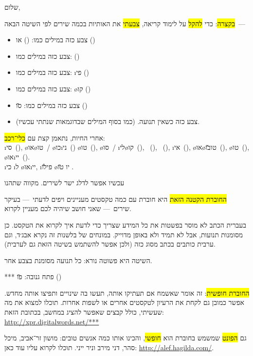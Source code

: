 שלום,

\hl{בקצרה}: כדי \hl{להקל} על לימוד קריאה, \hl{צבעתי} את האותיות בכמה שירים לפי השיטה הבאה~—
\begin{itemize}
	\item צבע כזה  במילים כמו:  () או  ()
	\item צבע כזה  במילים כמו:  ()
	\item צבע כזה  במילים כמו: \i{פי} ()
	\item צבע כזה  במילים כמו: \o{קו} ()
	\item צבע כזה  במילים כמו: \u{סו} ()
	\item צבע כזה  כשאין תנועה. (כמו בסוף המילים שבדוגמאות שנתתי עכשיו).
\end{itemize}

אחרי החיות, נתאמן קצת עם \hl{כלי־רכב}:\\
\i{סי}~(),
\o{או}\o{טו}~/ \o{כו}\i{ני}~()
\o{טו}~(),
\o{סו}~/ \i{לי}\o{קו}~(),
~(),
~(),
\i{אי}~(),
\o{או}\o{טו}\u{בו}~(),
\o{טו}~(),
\o{או}\i{יי}~().\\
\i{כי}  \i{ל}  \o{או}\i{יי},  \i{פי}\u{לו} \o{יו}  \u{טו} .

עכשיו אפשר לדלג ישר לשירים. מקווה שתהנו 

\hl{החוברת הקטנה הזאת} היא חוברת עם כמה טקסטים מעניינים ויפים לדעתי~— בעיקר שירים~— שאני חושב שיהיה לכם מעניין לקרוא.

בעברית הכתב לא מוסר בפשטות את כל המידע שצריך כדי לדעת איך לקרוא את הטקסט. כן מסומנות תנועות, אבל לא תמיד ולא באופן מדוייק. במונחים של בלשנות זה נקרא אבג׳ד, וגם ערבית כותבים בכתב מסוג כזה (ולכן אפשר להשתמש בשיטה הזאת גם לערבית).

השיטה היא פשוטה נורא: כל תנועה מסומנת בצבע אחר.

*** פתח גנובה: \u{פו}\gnuva {} ()

\hl{החוברת חופשית}: זה אומר שאשמח אם תעתיקו אותה, תעשו בה שינויים ותפיצו אותה מחדש. אפשר כמובן גם לקחת את הרעיון לטקסטים אחרים או לשפות אחרות. תוכלו למצוא את מה שעשיתי, כולל קבצים שאפשר להציג במחשב, בכתובת הזאת: \url{http://xpr.digitalwords.net/***}

גם \hl{הפונט} שמשמש בחוברת הוא \hl{חופשי}, והכינו אותו כמה אנשים טובים: מושון זר־אביב, מיכל סהר, דני מירב וניר ייני. תוכלו לקרוא עליו עוד כאן: \url{http://alef.hagilda.com/}.
